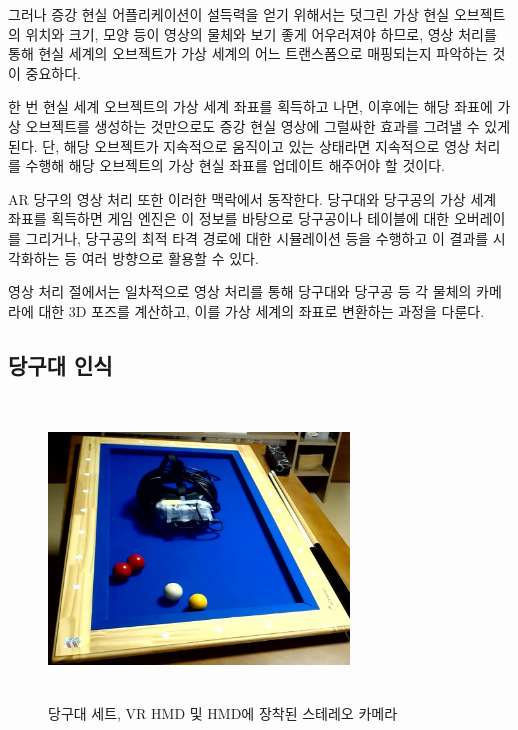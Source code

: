 \documentclass[10pt]{oblivoir}
\begin{document}
그러나 증강 현실 어플리케이션이 설득력을 얻기 위해서는 덧그린 가상 현실 오브젝트의 위치와 크기, 모양 등이 영상의 물체와 보기 좋게 어우러져야 하므로, 영상 처리를 통해 현실 세계의 오브젝트가 가상 세계의 어느 트랜스폼으로 매핑되는지 파악하는 것이 중요하다.

한 번 현실 세계 오브젝트의 가상 세계 좌표를 획득하고 나면, 이후에는 해당 좌표에 가상 오브젝트를 생성하는 것만으로도 증강 현실 영상에 그럴싸한 효과를 그려낼 수 있게 된다. 단, 해당 오브젝트가 지속적으로 움직이고 있는 상태라면 지속적으로 영상 처리를 수행해 해당 오브젝트의 가상 현실 좌표를 업데이트 해주어야 할 것이다.

AR 당구의 영상 처리 또한 이러한 맥락에서 동작한다. 당구대와 당구공의 가상 세계 좌표를 획득하면 게임 엔진은 이 정보를 바탕으로 당구공이나 테이블에 대한 오버레이를 그리거나, 당구공의 최적 타격 경로에 대한 시뮬레이션 등을 수행하고 이 결과를 시각화하는 등 여러 방향으로 활용할 수 있다.

영상 처리 절에서는 일차적으로 영상 처리를 통해 당구대와 당구공 등 각 물체의 카메라에 대한 3D 포즈를 계산하고, 이를 가상 세계의 좌표로 변환하는 과정을 다룬다.

\subsection{당구대 인식}

\label{section;imgproc;table}
\begin{figure}[ht]
    \centering
    \includegraphics[width=8cm, height=8cm, keepaspectratio]{img/billiards-table.png}
    \caption[Caption for LOF]{당구대 세트, VR HMD 및 HMD에 장착된 스테레오 카메라\footnotemark}
    \label{fig;pool-table}
\end{figure}

    
\end{document}
